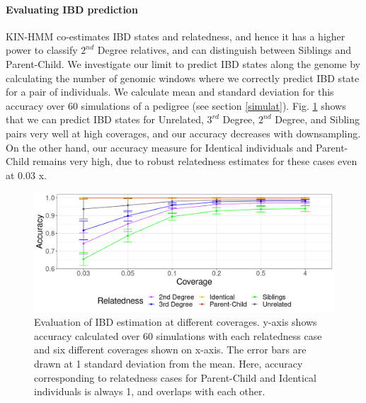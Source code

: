 \documentclass[12pt, letterpaper]{article}
\begin{document}
\paragraph{Evaluating IBD prediction}
KIN-HMM co-estimates IBD states and relatedness, and hence it has a higher power to classify $2^{nd}$ Degree relatives, and can distinguish between Siblings and Parent-Child. We investigate our limit to predict IBD states along the genome by calculating the number of genomic windows where we correctly  predict IBD state for a pair of individuals. We calculate mean and standard deviation for this accuracy over 60 simulations of a pedigree (see section \ref{simulat}). Fig. \ref{fig4:IBDstate_accuracy} shows that we can predict IBD states for Unrelated, $3^{rd}$ Degree, $2^{nd}$ Degree, and Sibling pairs very well at high coverages, and our accuracy decreases with downsampling. On the other hand, our accuracy measure for Identical individuals and Parent-Child remains very high, due to robust relatedness estimates for these cases even at 0.03 x.  


\begin{figure}[h!]
    \includegraphics[width=16cm]{plots/plotimg/plot_IBDaccuracy.png}
    \centering
    \caption{Evaluation of IBD estimation at different coverages. y-axis shows accuracy calculated over 60 simulations with each relatedness case and six different coverages shown on x-axis. The error bars are drawn at 1 standard deviation from the mean. Here, accuracy corresponding to relatedness cases for Parent-Child and Identical individuals is always 1, and overlaps with each other.}
    \label{fig4:IBDstate_accuracy}
\end{figure}
\end{document}
